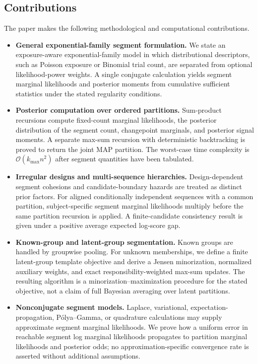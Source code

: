 \subsection{Contributions}
The paper makes the following methodological and computational contributions.
\begin{itemize}
  \item \EstablishedTag\enspace \textbf{General exponential-family segment formulation.} We state an exposure-aware exponential-family model in which distributional descriptors, such as Poisson exposure or Binomial trial count, are separated from optional likelihood-power weights. A single conjugate calculation yields segment marginal likelihoods and posterior moments from cumulative sufficient statistics under the stated regularity conditions.

  \item \EstablishedTag\enspace \textbf{Posterior computation over ordered partitions.} Sum-product recursions compute fixed-count marginal likelihoods, the posterior distribution of the segment count, changepoint marginals, and posterior signal moments. A separate max-sum recursion with deterministic backtracking is proved to return the joint MAP partition. The worst-case time complexity is $\mathcal O(k_{\max}n^2)$ after segment quantities have been tabulated.

  \item \EstablishedTag\enspace \textbf{Irregular designs and multi-sequence hierarchies.} Design-dependent segment cohesions and candidate-boundary hazards are treated as distinct prior factors. For aligned conditionally independent sequences with a common partition, subject-specific segment marginal likelihoods multiply before the same partition recursion is applied. A finite-candidate consistency result is given under a positive average expected log-score gap.

  \item \EstablishedTag\enspace \textbf{Known-group and latent-group segmentation.} Known groups are handled by groupwise pooling. For unknown memberships, we define a finite latent-group template objective and derive a Jensen minorization, normalized auxiliary weights, and exact responsibility-weighted max-sum updates. The resulting algorithm is a minorization--maximization procedure for the stated objective, not a claim of full Bayesian averaging over latent partitions.

  \item \ConditionalTag\enspace \textbf{Nonconjugate segment models.} Laplace, variational, expectation-propagation, P\'olya--Gamma, or quadrature calculations may supply approximate segment marginal likelihoods. We prove how a uniform error in reachable segment log marginal likelihoods propagates to partition marginal likelihoods and posterior odds; no approximation-specific convergence rate is asserted without additional assumptions.


\end{itemize}

